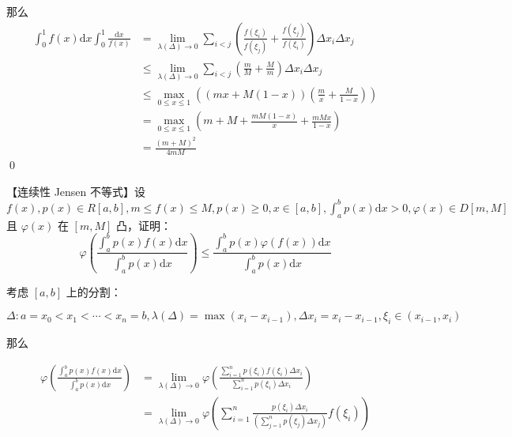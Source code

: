 那么
\begin{equation*}
	\begin{aligned}
		\int _{0}^{1} f( x)\mathrm{d} x\int _{0}^{1}\frac{\mathrm{d} x}{f( x)} & =\lim _{\lambda ( \Delta )\rightarrow 0}\sum _{i< j}\left(\frac{f( \xi _{i})}{f( \xi _{j})} +\frac{f( \xi _{j})}{f( \xi _{i})}\right) \Delta x_{i} \Delta x_{j}\\
		& \leqslant \lim _{\lambda ( \Delta )\rightarrow 0}\sum _{i< j}\left(\frac{m}{M} +\frac{M}{m}\right) \Delta x_{i} \Delta x_{j}\\
		& \leqslant \max_{0\leqslant x\leqslant 1}\left(( mx+M( 1-x))\left(\frac{m}{x} +\frac{M}{1-x}\right)\right)\\
		& =\max_{0\leqslant x\leqslant 1}\left( m+M+\frac{mM( 1-x)}{x} +\frac{mMx}{1-x}\right)\\
		& =\frac{( m+M)^{2}}{4mM}
	\end{aligned}
\end{equation*}
\qed 




\begin{ques}
	
【连续性 Jensen 不等式】设 $\displaystyle f( x) ,p( x) \in R[ a,b] ,m\leqslant f( x) \leqslant M,p( x) \geqslant 0,x\in [ a,b] ,\int _{a}^{b} p( x)\mathrm{d} x >0,\varphi ( x) \in D[ m,M]$ 且 $\displaystyle \varphi ( x)$ 在 $\displaystyle [ m,M]$ 凸，证明：
\begin{equation*}
	\varphi \left(\frac{\int _{a}^{b} p( x) f( x)\mathrm{d} x}{\int _{a}^{b} p( x)\mathrm{d} x}\right) \leqslant \frac{\int _{a}^{b} p( x) \varphi ( f( x))\mathrm{d} x}{\int _{a}^{b} p( x)\mathrm{d} x}
\end{equation*}


\end{ques}

考虑 $\displaystyle [ a,b]$ 上的分割：


\begin{equation*}
	\Delta :a=x_{0} < x_{1} < \cdots < x_{n} =b,\lambda ( \Delta ) =\max( x_{i} -x_{i-1}) ,\Delta x_{i} =x_{i} -x_{i-1} ,\xi _{i} \in ( x_{i-1} ,x_{i})
\end{equation*}


那么


\begin{equation*}
	\begin{aligned}
		\varphi \left(\frac{\int _{a}^{b} p( x) f( x)\mathrm{d} x}{\int _{a}^{b} p( x)\mathrm{d} x}\right) & =\lim _{\lambda ( \Delta )\rightarrow 0} \varphi \left(\frac{\sum _{i=1}^{n} p( \xi _{i}) f( \xi _{i}) \Delta x_{i}}{\sum _{i=1}^{n} p( \xi _{i}) \Delta x_{i}}\right)\\
		& =\lim _{\lambda ( \Delta )\rightarrow 0} \varphi \left(\sum _{i=1}^{n}\frac{p( \xi _{i}) \Delta x_{i}}{\left(\sum _{j=1}^{n} p( \xi _{j}) \Delta x_{j}\right)} f( \xi _{i})\right)
	\end{aligned}
\end{equation*}

